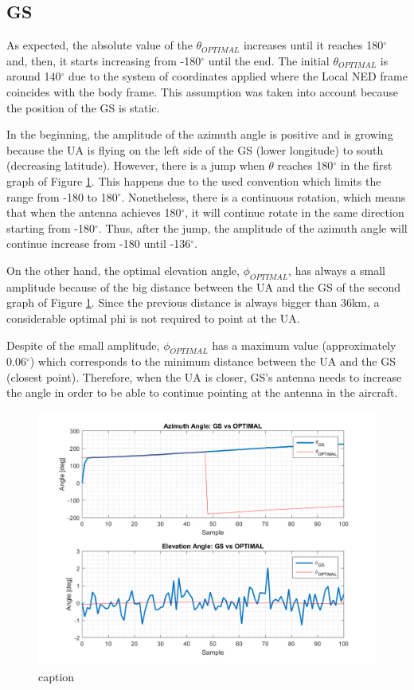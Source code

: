 \subsection{GS}
As expected, the absolute value of the $\theta_{OPTIMAL}$ increases until it reaches 180$^{\circ}$  and, then, it starts increasing from -180$^{\circ}$ until the end. The initial $\theta_{OPTIMAL}$ is around 140$^{\circ}$ due to the system of coordinates applied where the Local NED frame coincides with the body frame. This assumption was taken into account because the position of the GS is static.

In the beginning, the amplitude of the azimuth angle is positive and is growing because the UA is flying on the left side of the GS (lower longitude) to south (decreasing latitude). However, there is a jump when $\theta$ reaches 180$^{\circ}$ in the first graph of Figure \ref{fig:s1_pd_gs_alone}. This happens due to the used convention which limits the range from -180 to 180$^{\circ}$. Nonetheless, there is a continuous rotation, which means that when the antenna achieves 180$^{\circ}$, it will continue rotate in the same direction starting from -180$^{\circ}$. Thus, after the jump, the amplitude of the azimuth angle will continue increase from -180 until -136$^{\circ}$.

On the other hand, the optimal elevation angle, $\phi_{OPTIMAL}$, has always a small amplitude because of the big distance between the UA and the GS of the second graph of Figure \ref{fig:s1_pd_gs_alone}. Since the previous distance is always bigger than 36km, a considerable optimal phi is not required to point at the UA. 

Despite of the small amplitude, $\phi_{OPTIMAL}$ has a maximum value (approximately 0.06$^{\circ}$) which corresponds to the minimum distance between the UA and the GS (closest point). Therefore, when the UA is closer, GS’s antenna needs to increase the angle in order to be able to continue pointing at the antenna in the aircraft.

\begin{figure}[H]
	\centering
	\includegraphics[scale=0.75]{figures/s1_pd_gs.png}
	\caption{caption}
	\label{fig:s1_pd_gs_alone}
\end{figure}

